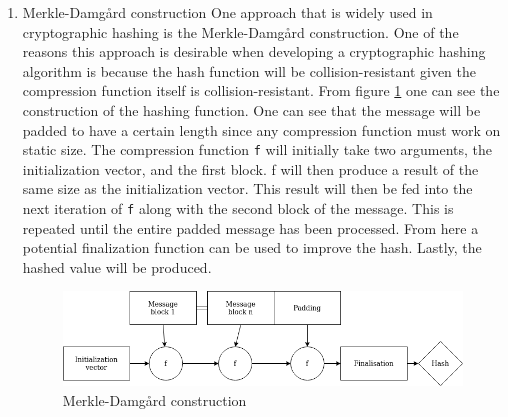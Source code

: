 \documentclass[a4paper]{article}
\begin{document}
\begin{enumerate}
\item Merkle-Damgård construction
\label{sec:orgaff49d5}
One approach that is widely used in cryptographic hashing is the Merkle-Damgård construction. One of the reasons this approach is desirable when developing a cryptographic hashing algorithm is because the hash function will be collision-resistant given the compression function itself is collision-resistant.
From figure \ref{fig:Merkle} one can see the construction of the hashing function. One can see that the message will be padded to have a certain length since any compression function must work on static size. The compression function \texttt{f} will initially take two arguments, the initialization vector, and the first block. f will then produce a result of the same size as the initialization vector. This result will then be fed into the next iteration of \texttt{f} along with the second block of the message. This is repeated until the entire padded message has been processed. From here a potential finalization function can be used to improve the hash. Lastly, the hashed value will be produced.

\begin{figure}[htbp]
\centering
\includegraphics[width=.9\linewidth]{Background/merkle.png}
\caption{\label{fig:Merkle}Merkle-Damgård construction}
\end{figure}
\end{enumerate}
\end{document}
